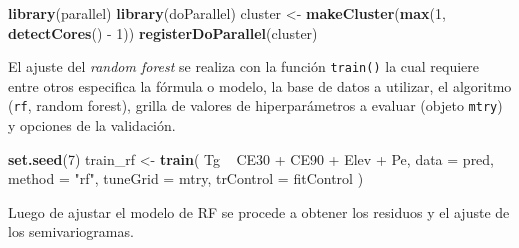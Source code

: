 \documentclass[11pt,b5paper,]{krantz}
\newenvironment{Shaded}{}{}
\newcommand{\DataTypeTok}[1]{\textcolor[rgb]{0.56,0.13,0.00}{#1}}
\newcommand{\DecValTok}[1]{\textcolor[rgb]{0.25,0.63,0.44}{#1}}
\newcommand{\KeywordTok}[1]{\textcolor[rgb]{0.00,0.44,0.13}{\textbf{#1}}}
\newcommand{\NormalTok}[1]{#1}
\newcommand{\OperatorTok}[1]{\textcolor[rgb]{0.40,0.40,0.40}{#1}}
\newcommand{\StringTok}[1]{\textcolor[rgb]{0.25,0.44,0.63}{#1}}
\begin{document}
\begin{Shaded}
\begin{Highlighting}[]
\KeywordTok{library}\NormalTok{(parallel)}
\KeywordTok{library}\NormalTok{(doParallel)}
\NormalTok{cluster <-}\StringTok{ }\KeywordTok{makeCluster}\NormalTok{(}\KeywordTok{max}\NormalTok{(}\DecValTok{1}\NormalTok{, }\KeywordTok{detectCores}\NormalTok{() }\OperatorTok{-}\StringTok{ }\DecValTok{1}\NormalTok{))}
\KeywordTok{registerDoParallel}\NormalTok{(cluster)}
\end{Highlighting}
\end{Shaded}

El ajuste del \emph{random forest} se realiza con la función \texttt{train()} la cual requiere entre otros especifica la fórmula o modelo, la base de datos a utilizar, el algoritmo (\texttt{rf}, random forest), grilla de valores de hiperparámetros a evaluar (objeto \texttt{mtry}) y opciones de la validación.

\begin{Shaded}
\begin{Highlighting}[]
\KeywordTok{set.seed}\NormalTok{(}\DecValTok{7}\NormalTok{)}
\NormalTok{train_rf <-}\StringTok{ }\KeywordTok{train}\NormalTok{(}
\NormalTok{  Tg }\OperatorTok{~}\StringTok{ }\NormalTok{CE30 }\OperatorTok{+}\StringTok{ }\NormalTok{CE90 }\OperatorTok{+}\StringTok{ }\NormalTok{Elev }\OperatorTok{+}\StringTok{ }\NormalTok{Pe,}
  \DataTypeTok{data =}\NormalTok{ pred,}
  \DataTypeTok{method =} \StringTok{"rf"}\NormalTok{,}
  \DataTypeTok{tuneGrid =}\NormalTok{ mtry,}
  \DataTypeTok{trControl =}\NormalTok{ fitControl}
\NormalTok{)}
\end{Highlighting}
\end{Shaded}

Luego de ajustar el modelo de RF se procede a obtener los residuos y el ajuste de los semivariogramas.

\begin{Shaded}
\end{Shaded}
\end{document}
